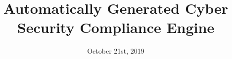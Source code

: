 \documentclass{src/ecsgdp}
\begin{document}
\frontmatter
\title      {Automatically Generated Cyber Security Compliance Engine}
\addresses  {\groupname\\\deptname\\\univname}
\date       {October 21st, 2019}
\subject    {}
\keywords   {}
\maketitle

\begin{abstract}

\end{abstract}

\tableofcontents
\listoffigures
\listoftables
\lstlistoflistings



\mainmatter







\backmatter



\appendix

\end{document}
